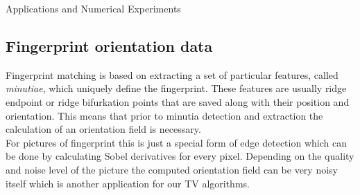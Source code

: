 \begin{chapter}{Applications and Numerical Experiments}
\subsection{Fingerprint orientation data} %
\label{sub:Fingerprint orientation data}
Fingerprint matching is  based on extracting a set of particular features, called \emph{minutiae}, which uniquely define the fingerprint.
These features are usually ridge endpoint or ridge bifurkation points that are saved along with their position and orientation. This
means that prior to minutia detection and extraction the calculation of an orientation field is necessary.\\

For pictures of fingerprint this is just a special form of edge detection which can be done by calculating Sobel derivatives for every pixel.
Depending on the quality and noise level of the picture the computed orientation field can be very noisy itself which is another application
for our TV algorithms.\\


\end{chapter}
